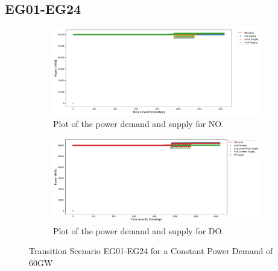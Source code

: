 \documentclass[11pt,letterpaper]{article}
\begin{document}
\subsection{EG01-EG24}

\begin{figure}[]
	\centering
	\begin{subfigure}[t]{\textwidth}
		\centering
		\includegraphics[width=\linewidth]{24-power1.png} 
		\caption{Plot of the power demand and supply for NO.}
		\label{fig:24powerNO}
	\end{subfigure}
	\vspace{1cm}
	\begin{subfigure}[t]{\textwidth}
		\centering
		\includegraphics[width=\linewidth]{24-power2.png} 
		\caption{Plot of the power demand and supply for DO.}
		\label{fig:24powerDO}
	\end{subfigure}
	\hfill
	\caption{Transition Scenario EG01-EG24 for a Constant Power Demand of 60GW}
\end{figure}
\end{document}
